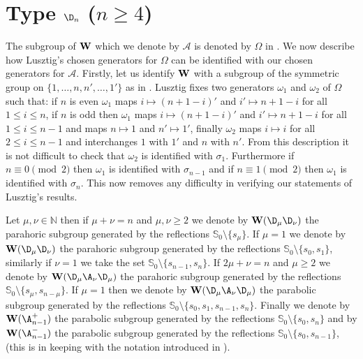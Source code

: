 \documentclass[eqthmnum]{jt-calcs}
\renewcommand{\cref}{\Cref}
\begin{document}
\section{\texorpdfstring{Type $\D_n$ ($n \geqslant 4$)}{Type D}}\label{chap:prop-A-type-D}
\begin{rem}
The subgroup of $\mathbf{W}$ which we denote by $\mathcal{A}$ is denoted by $\Omega$ in \cite{lusztig:2009:unipotent-classes-and-special-Weyl}. We now describe how Lusztig's chosen generators for $\Omega$ can be identified with our chosen generators for $\mathcal{A}$. Firstly, let us identify $\mathbf{W}$ with a subgroup of the symmetric group on $\{1,\dots,n,n',\dots,1'\}$ as in \cite[5.1]{lusztig:2009:unipotent-classes-and-special-Weyl}. Lusztig fixes two generators $\omega_1$ and $\omega_2$ of $\Omega$ such that: if $n$ is even $\omega_1$ maps $i \mapsto (n+1-i)'$ and $i' \mapsto n+1-i$ for all $1 \leqslant i \leqslant n$, if $n$ is odd then $\omega_1$ maps $i \mapsto (n+1-i)'$ and $i' \mapsto n+1-i$ for all $1 \leqslant i \leqslant n-1$ and maps $n \mapsto 1$ and $n' \mapsto 1'$, finally $\omega_2$ maps $i \mapsto i$ for all $2 \leqslant i \leqslant n-1$ and interchanges $1$ with $1'$ and $n$ with $n'$. From this description it is not difficult to check that $\omega_2$ is identified with $\sigma_1$. Furthermore if $n \equiv 0 \pmod{2}$ then $\omega_1$ is identified with $\sigma_{n-1}$ and if $n \equiv 1\pmod{2}$ then $\omega_1$ is identified with $\sigma_n$. This now removes any difficulty in verifying our statements of Lusztig's results.
\end{rem}

\begin{pa}
Let $\mu,\nu \in \mathbb{N}$ then if $\mu+\nu = n$ and $\mu,\nu\geqslant 2$ we denote by $\bW(\D_{\mu}\D_{\nu})$ the parahoric subgroup generated by the reflections $\mathbb{S}_0\setminus\{s_{\mu}\}$. If $\mu=1$ we denote by $\bW(\D_{\mu}\D_{\nu})$ the parahoric subgroup generated by the reflections $\mathbb{S}_0\setminus\{s_0,s_1\}$, similarly if $\nu=1$ we take the set $\mathbb{S}_0\setminus\{s_{n-1},s_n\}$. If $2\mu+\nu = n$ and $\mu\geqslant 2$ we denote by $\bW(\D_{\mu}\A_{\nu}\D_{\mu})$ the parahoric subgroup generated by the reflections $\mathbb{S}_0\setminus\{s_{\mu},s_{n-\mu}\}$. If $\mu = 1$ then we denote by $\bW(\D_{\mu}\A_{\nu}\D_{\mu})$ the parabolic subgroup generated by the reflections $\mathbb{S}_0\setminus\{s_0,s_1,s_{n-1},s_n\}$. Finally we denote by $\bW(\A_{n-1}^+)$ the parabolic subgroup generated by the reflections $\mathbb{S}_0\setminus\{s_0,s_n\}$ and by $\bW(\A_{n-1}^-)$ the parabolic subgroup generated by the reflections $\mathbb{S}_0\setminus\{s_0,s_{n-1}\}$, (this is in keeping with the notation introduced in \cref{sec:clarification-typeD}).
\end{pa}
\end{document}
